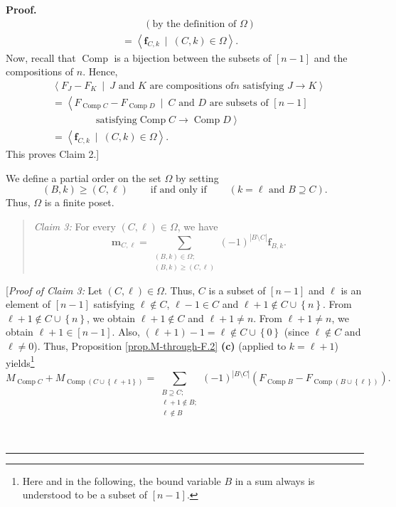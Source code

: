 \documentclass[numbers=enddot,12pt,final,onecolumn,notitlepage]{scrartcl}%
\theoremstyle{definition}
\newenvironment{statement}{\begin{quote}}{\end{quote}}
\newenvironment{proof}[1][Proof]{\noindent\textbf{#1.} }{\ \rule{0.5em}{0.5em}}
\let\sumnonlimits\sum
\renewcommand{\sum}{\sumnonlimits\limits}
\begin{document}
\begin{proof}
\begin{align*}
&  \ \ \ \ \ \ \ \ \ \ \left(  \text{by the definition of }\Omega\right) \\
&  =\left\langle \mathbf{f}_{C,k}\ \mid\ \left(  C,k\right)  \in
\Omega\right\rangle .
\end{align*}
Now, recall that $\operatorname*{Comp}$ is a bijection between the subsets of
$\left[  n-1\right]  $ and the compositions of $n$. Hence,%
\begin{align*}
&  \left\langle F_{J}-F_{K}\ \mid\ J\text{ and }K\text{ are compositions of
}n\text{ satisfying }J\rightarrow K\right\rangle \\
&  =\left\langle F_{\operatorname*{Comp}C}-F_{\operatorname*{Comp}D}%
\ \mid\ C\text{ and }D\text{ are subsets of }\left[  n-1\right]  \right. \\
&  \ \ \ \ \ \ \ \ \ \ \ \ \ \ \ \ \ \ \ \ \left.  \text{satisfying
}\operatorname*{Comp}C\rightarrow\operatorname*{Comp}D\right\rangle \\
&  =\left\langle \mathbf{f}_{C,k}\ \mid\ \left(  C,k\right)  \in
\Omega\right\rangle .
\end{align*}
This proves Claim 2.]

We define a partial order on the set $\Omega$ by setting%
\[
\left(  B,k\right)  \geq\left(  C,\ell\right)  \ \ \ \ \ \ \ \ \ \ \text{if
and only if}\ \ \ \ \ \ \ \ \ \ \left(  k=\ell\text{ and }B\supseteq C\right)
.
\]
Thus, $\Omega$ is a finite poset.

\begin{statement}
\textit{Claim 3:} For every $\left(  C,\ell\right)  \in\Omega$, we have%
\[
\mathbf{m}_{C,\ell}=\sum_{\substack{\left(  B,k\right)  \in\Omega;\\\left(
B,k\right)  \geq\left(  C,\ell\right)  }}\left(  -1\right)  ^{\left\vert
B\setminus C\right\vert }\mathbf{f}_{B,k}.
\]

\end{statement}

[\textit{Proof of Claim 3:} Let $\left(  C,\ell\right)  \in\Omega$. Thus, $C$
is a subset of $\left[  n-1\right]  $ and $\ell$ is an element of $\left[
n-1\right]  $ satisfying $\ell\notin C$, $\ell-1\in C$ and $\ell+1\notin
C\cup\left\{  n\right\}  $. From $\ell+1\notin C\cup\left\{  n\right\}  $, we
obtain $\ell+1\notin C$ and $\ell+1\neq n$. From $\ell+1\neq n$, we obtain
$\ell+1\in\left[  n-1\right]  $. Also, $\left(  \ell+1\right)  -1=\ell\notin
C\cup\left\{  0\right\}  $ (since $\ell\notin C$ and $\ell\neq0$). Thus,
Proposition \ref{prop.M-through-F.2} \textbf{(c)} (applied to $k=\ell+1$)
yields\footnote{Here and in the following, the bound variable $B$ in a sum
always is understood to be a subset of $\left[  n-1\right]  $.}%
\[
M_{\operatorname*{Comp}C}+M_{\operatorname*{Comp}\left(  C\cup\left\{
\ell+1\right\}  \right)  }=\sum_{\substack{B\supseteq C;\\\ell+1\notin
B;\\\ell\notin B}}\left(  -1\right)  ^{\left\vert B\setminus C\right\vert
}\left(  F_{\operatorname*{Comp}B}-F_{\operatorname*{Comp}\left(
B\cup\left\{  \ell\right\}  \right)  }\right)  .
\]



\end{proof}
\end{document}
